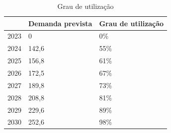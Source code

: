 \documentclass[
	12pt,				%
	openright,			%
	oneside,			%
	a4paper,			%
	english,			%
	french,				%
	spanish,			%
	brazil				%
	]{abntex2}
\begin{document}
\begin{table}[H]
\centering
\caption{Grau de utilização}
\label{grau}
\begin{tabular}{l|l|l}
\rowcolor[HTML]{EFEFEF} 
\multicolumn{1}{c|}{\cellcolor[HTML]{EFEFEF}\textbf{Ano}} & \multicolumn{1}{c|}{\cellcolor[HTML]{EFEFEF}\textbf{Demanda prevista}} & \multicolumn{1}{c}{\cellcolor[HTML]{EFEFEF}\textbf{Grau de utilização}} \\ \hline
2023                                                      & 0                                                                      & 0\%                                                                     \\ \hline
2024                                                      & 142,6                                                                  & 55\%                                                                    \\ \hline
2025                                                      & 156,8                                                                  & 61\%                                                                    \\ \hline
2026                                                      & 172,5                                                                  & 67\%                                                                    \\ \hline
2027                                                      & 189,8                                                                  & 73\%                                                                    \\ \hline
2028                                                      & 208,8                                                                  & 81\%                                                                    \\ \hline
2029                                                      & 229,6                                                                  & 89\%                                                                    \\ \hline
2030                                                      & 252,6                                                                  & 98\%                                                                   
\end{tabular}
\end{table}
\end{document}
